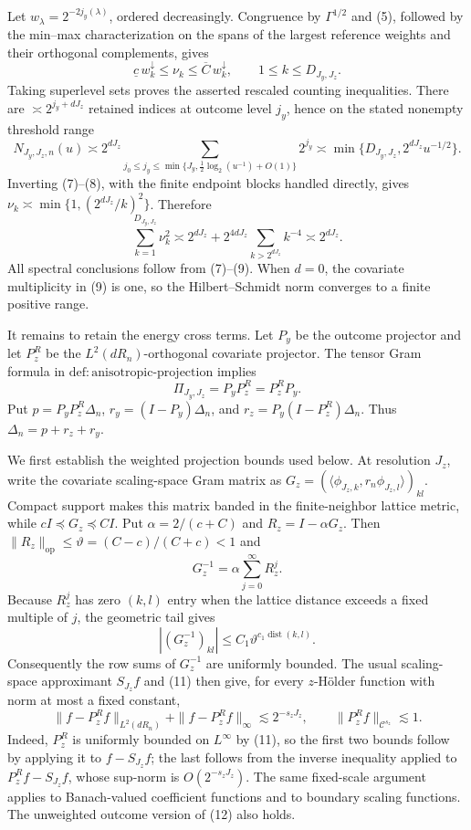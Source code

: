 Let \(w_\lambda=2^{-2j_y(\lambda)}\), ordered decreasingly. Congruence by \(\Gamma^{1/2}\) and (5), followed by the min--max characterization on the spans of the largest reference weights and their orthogonal complements, gives
\[
\underline c\,w_k^\downarrow\le\nu_k\le\overline C\,w_k^\downarrow,
\qquad 1\le k\le D_{J_y,J_z}.                                   \tag{7}
\]
Taking superlevel sets proves the asserted rescaled counting inequalities. There are \(\asymp2^{j_y+dJ_z}\) retained indices at outcome level \(j_y\), hence on the stated nonempty threshold range
\[
N_{J_y,J_z,n}(u)
\asymp2^{dJ_z}\sum_{j_0\le j_y\le\min\{J_y,\frac12\log_2(u^{-1})+O(1)\}}2^{j_y}
\asymp\min\{D_{J_y,J_z},2^{dJ_z}u^{-1/2}\}.                    \tag{8}
\]
Inverting (7)--(8), with the finite endpoint blocks handled directly, gives \(\nu_k\asymp\min\{1,(2^{dJ_z}/k)^2\}\). Therefore
\[
\sum_{k=1}^{D_{J_y,J_z}}\nu_k^2
\asymp2^{dJ_z}+2^{4dJ_z}\sum_{k>2^{dJ_z}}k^{-4}\asymp2^{dJ_z}. \tag{9}
\]
All spectral conclusions follow from (7)--(9). When \(d=0\), the covariate multiplicity in (9) is one, so the Hilbert--Schmidt norm converges to a finite positive range.

It remains to retain the energy cross terms. Let \(P_y\) be the outcome projector and let \(P_z^R\) be the \(L^2(dR_n)\)-orthogonal covariate projector. The tensor Gram formula in \(\mathrm{def{:}anisotropic\text{-}projection}\) implies
\[
\Pi_{J_y,J_z}=P_yP_z^R=P_z^RP_y.                                \tag{10}
\]
Put \(p=P_yP_z^R\Delta_n\), \(r_y=(I-P_y)\Delta_n\), and \(r_z=P_y(I-P_z^R)\Delta_n\). Thus \(\Delta_n=p+r_z+r_y\).

We first establish the weighted projection bounds used below. At resolution \(J_z\), write the covariate scaling-space Gram matrix as \(G_z=(\langle\phi_{J_z,k},r_n\phi_{J_z,l}\rangle)_{kl}\). Compact support makes this matrix banded in the finite-neighbor lattice metric, while \(cI\preceq G_z\preceq CI\). Put \(\alpha=2/(c+C)\) and \(R_z=I-\alpha G_z\). Then \(\|R_z\|_{\mathrm{op}}\le\vartheta=(C-c)/(C+c)<1\) and
\[
G_z^{-1}=\alpha\sum_{j=0}^{\infty}R_z^j.
\]
Because \(R_z^j\) has zero \((k,l)\) entry when the lattice distance exceeds a fixed multiple of \(j\), the geometric tail gives
\[
|(G_z^{-1})_{kl}|\le C_1\vartheta^{c_1\operatorname{dist}(k,l)}. \tag{11}
\]
Consequently the row sums of \(G_z^{-1}\) are uniformly bounded. The usual scaling-space approximant \(S_{J_z}f\) and (11) then give, for every \(z\)-H\"older function with norm at most a fixed constant,
\[
\|f-P_z^Rf\|_{L^2(dR_n)}+\|f-P_z^Rf\|_\infty\lesssim2^{-s_zJ_z},
\qquad \|P_z^Rf\|_{\mathcal C^{s_z}}\lesssim1.                 \tag{12}
\]
Indeed, \(P_z^R\) is uniformly bounded on \(L^\infty\) by (11), so the first two bounds follow by applying it to \(f-S_{J_z}f\); the last follows from the inverse inequality applied to \(P_z^Rf-S_{J_z}f\), whose sup-norm is \(O(2^{-s_zJ_z})\). The same fixed-scale argument applies to Banach-valued coefficient functions and to boundary scaling functions. The unweighted outcome version of (12) also holds.

